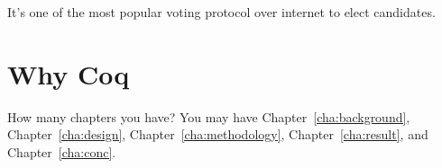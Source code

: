 It's one of the most popular voting protocol 
over internet to elect candidates. 






\section{Why Coq}
\label{sec:outline}
How many chapters you have? You may have Chapter~\ref{cha:background},
Chapter~\ref{cha:design}, Chapter~\ref{cha:methodology},
Chapter~\ref{cha:result}, and Chapter~\ref{cha:conc}.
